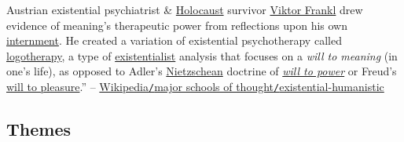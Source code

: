 \documentclass[oneside]{book}
\numberwithin{equation}{section}
\begin{document}
Austrian existential psychiatrist \& \href{https://en.wikipedia.org/wiki/Holocaust}{Holocaust} survivor \href{https://en.wikipedia.org/wiki/Viktor_Frankl}{Viktor Frankl} drew evidence of meaning's therapeutic power from reflections upon his own \href{https://en.wikipedia.org/wiki/Internment}{internment}. He created a variation of existential psychotherapy called \href{https://en.wikipedia.org/wiki/Logotherapy}{logotherapy}, a type of \href{https://en.wikipedia.org/wiki/Existentialism}{existentialist} analysis that focuses on a \textit{will to meaning} (in one's life), as opposed to Adler's \href{https://en.wikipedia.org/wiki/Nietzsche}{Nietzschean} doctrine of \href{https://en.wikipedia.org/wiki/Will_to_power}{\textit{will to power}} or Freud's \href{https://en.wikipedia.org/wiki/Pleasure_principle_(psychology)}{will to pleasure}.'' -- \href{https://en.wikipedia.org/wiki/Psychology#Existential-humanistic}{Wikipedia\texttt{/}major schools of thought\texttt{/}existential-humanistic}

\subsection{Themes}
\end{document}
